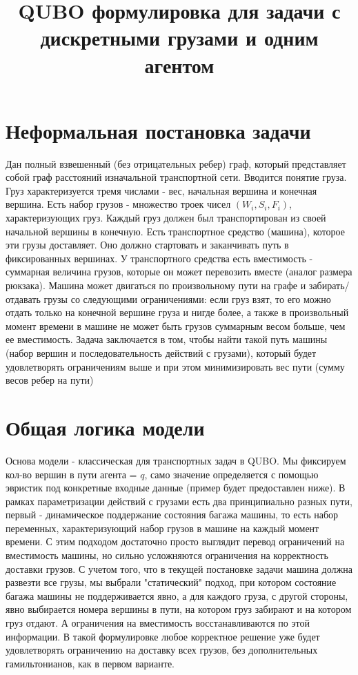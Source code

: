 \documentclass{article}
\title{QUBO формулировка для задачи с дискретными грузами и одним агентом}
\date{}
\begin{document}
\maketitle

\section{Неформальная постановка задачи}
\par
Дан полный взвешенный (без отрицательных ребер) граф, который представляет собой граф расстояний изначальной транспортной сети. Вводится понятие груза. Груз характеризуется тремя числами - вес, начальная вершина и конечная вершина. Есть набор грузов - множество троек чисел \((W_i, S_i, F_i)\), характеризующих груз. Каждый груз должен был транспортирован из своей начальной вершины в конечную. Есть транспортное средство (машина), которое эти грузы доставляет. Оно должно стартовать и заканчивать путь в фиксированных вершинах. У транспортного средства есть вместимость - суммарная величина грузов, которые он может перевозить вместе (аналог размера рюкзака). Машина может двигаться по произвольному пути на графе и забирать/отдавать грузы со следующими ограничениями: если груз взят, то его можно отдать только на конечной вершине груза и нигде более, а также в произвольный момент времени в машине не может быть грузов суммарным весом больше, чем ее вместимость. Задача заключается в том, чтобы найти такой путь машины (набор вершин и последовательность действий с грузами), который будет удовлетворять ограничениям выше и при этом минимизировать вес пути (сумму весов ребер на пути)

\section{Общая логика модели}

Основа модели - классическая для транспортных задач в QUBO. Мы фиксируем кол-во вершин в пути агента = $q$, само значение определяется с помощью эвристик под конкретные входные данные (пример будет предоставлен ниже). В рамках параметризации действий с грузами есть два принципиально разных пути, первый - динамическое поддержание состояния багажа машины, то есть набор переменных, характеризующий набор грузов в машине на каждый момент времени. С этим подходом достаточно просто выглядит перевод ограничений на вместимость машины, но сильно усложняются ограничения на корректность доставки грузов. С учетом того, что в текущей постановке задачи машина должна развезти все грузы, мы выбрали "статический" подход, при котором состояние багажа машины не поддерживается явно, а для каждого груза, с другой стороны, явно выбирается номера вершины в пути, на котором груз забирают и на котором груз отдают. А ограничения на вместимость восстанавливаются по этой информации. В такой формулировке любое корректное решение уже будет удовлетворять ограничению на доставку всех грузов, без дополнительных гамильтонианов, как в первом варианте. \par
\end{document}
